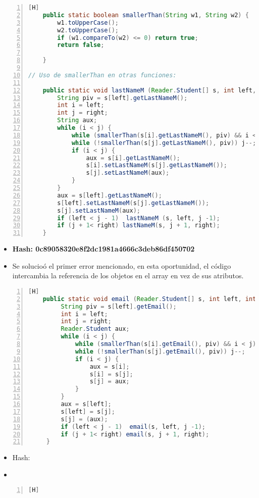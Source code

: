  \begin{lstlisting}[language=Java, caption={Commit: Se mejoró los métodos que ordenan Strings}, numbers=left, firstnumber=1][H]
    public static boolean smallerThan(String w1, String w2) {
        w1.toUpperCase();
        w2.toUpperCase();
        if (w1.compareTo(w2) <= 0) return true;
        return false;
 
    }

// Uso de smallerThan en otras funciones:

    public static void lastNameM (Reader.Student[] s, int left, int right) {
        String piv = s[left].getLastNameM();
        int i = left;
        int j = right;
        String aux;
        while (i < j) {
            while (smallerThan(s[i].getLastNameM(), piv) && i < j) i++;
            while (!smallerThan(s[j].getLastNameM(), piv)) j--;
            if (i < j) {
                aux = s[i].getLastNameM();
                s[i].setLastNameM(s[j].getLastNameM()); 
                s[j].setLastNameM(aux);
            }
        }
        aux = s[left].getLastNameM();
        s[left].setLastNameM(s[j].getLastNameM());
        s[j].setLastNameM(aux);
        if (left < j - 1)  lastNameM (s, left, j -1);
        if (j + 1< right) lastNameM(s, j + 1, right);
    }

  \end{lstlisting}
  \begin{itemize}
    \item \textbf{Hash: 0c89058320e8f2dc1981a4666c3deb86df450702}
    \item Se solucioó el primer error mencionado, en esta oportunidad, el código intercambia la referencia de los objetos en el array en vez de sus atributos.
  \end{itemize}
  \begin{lstlisting}[language=Java, caption={Commit: Se solucionó error de cambio de valores de atributos en vez de las referencias de los objetos}, numbers=left, firstnumber=1][H]
    public static void email (Reader.Student[] s, int left, int right) {
         String piv = s[left].getEmail();
         int i = left;
         int j = right;
         Reader.Student aux;
         while (i < j) {
             while (smallerThan(s[i].getEmail(), piv) && i < j) i++;
             while (!smallerThan(s[j].getEmail(), piv)) j--;
             if (i < j) {
                 aux = s[i];
                 s[i] = s[j]; 
                 s[j] = aux;
             }
         }
         aux = s[left];
         s[left] = s[j];
         s[j] = (aux);
         if (left < j - 1)  email(s, left, j -1);
         if (j + 1< right) email(s, j + 1, right);
     }

  \end{lstlisting}
  \begin{itemize}
    \item Hash: 
    \item
  \end{itemize}
  \begin{lstlisting}[language=Java, caption={TITULOOOOOO}, numbers=left, firstnumber=1][H]
  \end{lstlisting}
